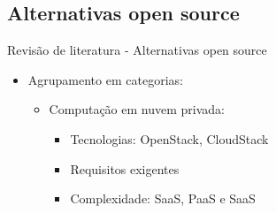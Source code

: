 \documentclass[10pt,brazil]{beamer}
\theoremstyle{definition}
\begin{document}
\subsection{Alternativas open source}

\begin{frame}{Revisão de literatura - Alternativas open source}
  \begin{itemize}
    \item Agrupamento em categorias:
          \begin{itemize}
            \item Computação em nuvem privada:
                  \begin{itemize}
                    \item Tecnologias: OpenStack\textregistered, CloudStack\textregistered

                    \item Requisitos exigentes
                    \item Complexidade: SaaS, PaaS e SaaS %
                  \end{itemize}

          \end{itemize}
  \end{itemize}
\end{frame}
\end{document}
